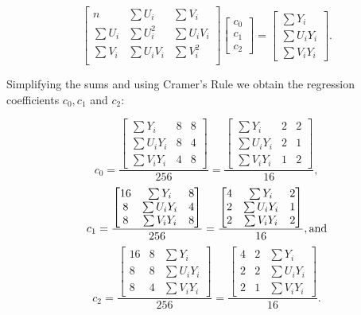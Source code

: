 \documentclass[a4paper, 12pt]{article}
\begin{document}
\[
\begin{bmatrix}
   n& \sum U_i& \sum V_i \\
\sum U_i&\sum U_i^2&\sum U_iV_i\\
\sum V_i& \sum U_iV_i& \sum V_i^2\\
     
\end{bmatrix}
%
\begin{bmatrix}
   c_0 \\
c_1\\
c_2   
\end{bmatrix}
= 
\begin{bmatrix}
\sum Y_i\\
\sum U_iY_i\\
\sum V_iY_i    
\end{bmatrix} 
.
\]

{\flushleft Simplifying} the sums and using Cramer's Rule  we obtain the regression coefficients $c_0,c_1$ and $c_2$:

$$
c_0 = 
\frac{
\begin{bmatrix}
\sum Y_i & 8 & 8\\
\sum U_iY_i& 8 & 4\\
\sum V_iY_i & 4 & 8  
\end{bmatrix}
}{256} = \frac{
\begin{bmatrix}
\sum Y_i & 2 & 2\\
\sum U_iY_i& 2 & 1\\
\sum V_iY_i & 1 & 2  
\end{bmatrix}
}{16},
$$
$$
c_1 = 
\frac{
\begin{bmatrix}
16 & \sum Y_i & 8 \\
8 & \sum U_iY_i& 4\\
8 & \sum V_iY_i & 8  
\end{bmatrix}
}{256} = \frac{
\begin{bmatrix}
4 & \sum Y_i & 2 \\
2 & \sum U_iY_i& 1\\
2 & \sum V_iY_i & 2  
\end{bmatrix}
}{16}, \textup{and}
$$
$$
c_2 = 
\frac{
\begin{bmatrix}
16 &  8 & \sum Y_i\\
8 & 8 & \sum U_iY_i \\
8 & 4 & \sum V_iY_i  
\end{bmatrix}
}{256} = \frac{
\begin{bmatrix}
4 & 2 & \sum Y_i\\
2 & 2 & \sum U_iY_i \\
2 & 1 & \sum V_iY_i  
\end{bmatrix}
}{16}.
$$
\end{document}
